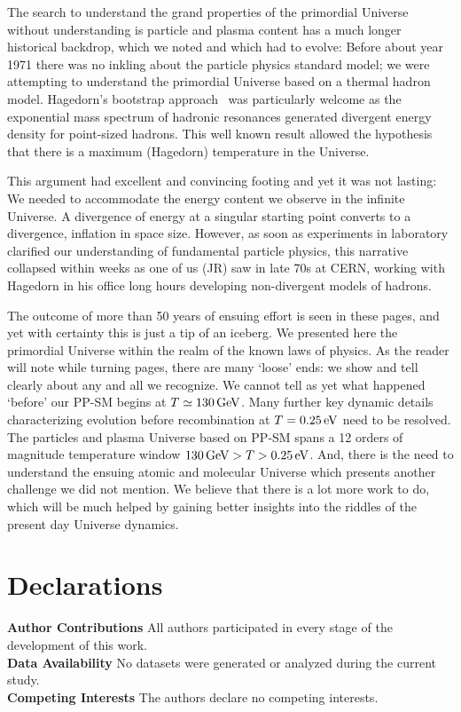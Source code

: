 The search to understand the grand properties of the primordial Universe without understanding is particle and plasma content has a much longer historical backdrop, which we noted and which had to evolve: Before about year 1971 there was no inkling about the particle physics standard model; we were attempting to understand the primordial Universe based on a thermal hadron model. Hagedorn's bootstrap approach~\cite{Rafelski:2016hnq} was particularly welcome as the exponential mass spectrum of hadronic resonances generated divergent energy density for point-sized hadrons. This well known result allowed the hypothesis that there is a maximum (Hagedorn) temperature in the Universe. 

This argument had excellent and convincing footing and yet it was not lasting: We needed to accommodate the energy content we observe in the infinite Universe. A divergence of energy at a singular starting point converts to a divergence, inflation in space size. However, as soon as experiments in laboratory clarified our understanding of fundamental particle physics, this narrative collapsed within weeks as one of us (JR) saw in late 70s at CERN, working with Hagedorn in his office long hours developing non-divergent models of hadrons. 

The outcome of more than 50 years of ensuing effort is seen in these pages, and yet with certainty this is just a tip of an iceberg. We presented here the primordial Universe within the realm of the known laws of physics. As the reader will note while  turning pages, there are many `loose' ends: we show and tell clearly about any and all we recognize. We cannot tell as yet what happened `before' our PP-SM begins at $T\simeq 130\text{\,GeV}$. Many further key dynamic details characterizing evolution before recombination at $T=0.25\text{\,eV}$ need to be resolved. The particles and plasma Universe based on PP-SM spans a 12 orders of magnitude temperature window $ 130\text{\,GeV} > T > 0.25\text{\,eV} $. And, there is the need to understand the ensuing atomic and molecular Universe which presents another challenge we did not mention. We believe that there is a lot more work to do, which will be much helped by gaining better insights into the riddles of the present day Universe dynamics.


\section*{Declarations}
\textbf{Author Contributions} All authors participated in every stage of the development of this work.\\
\textbf{Data Availability} No datasets were generated or analyzed during the current study.\\
\textbf{Competing Interests} The authors declare no competing interests.
